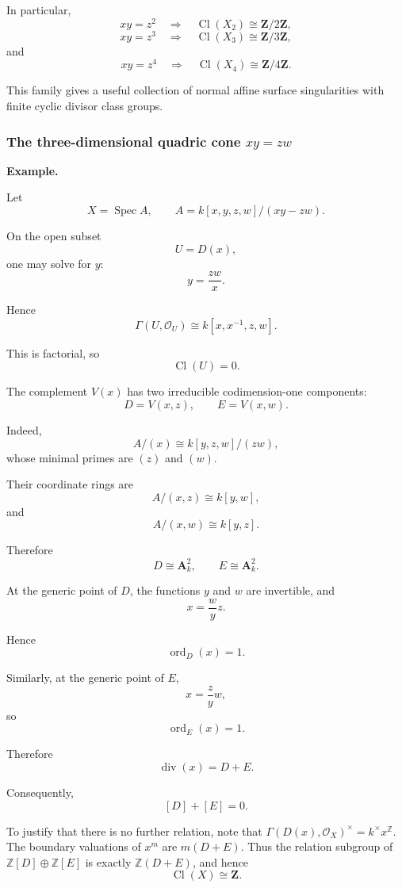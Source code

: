 In particular,
\[
xy=z^2
\quad\Longrightarrow\quad
\operatorname{Cl}(X_2)\cong\mathbf Z/2\mathbf Z,
\]
\[
xy=z^3
\quad\Longrightarrow\quad
\operatorname{Cl}(X_3)\cong\mathbf Z/3\mathbf Z,
\]
and
\[
xy=z^4
\quad\Longrightarrow\quad
\operatorname{Cl}(X_4)\cong\mathbf Z/4\mathbf Z.
\]

This family gives a useful collection of normal affine surface singularities with finite cyclic divisor class groups.

\subsubsection{\texorpdfstring{The three-dimensional quadric cone \(xy=zw\)}{The quadric cone xy=zw}}

\textbf{Example.}

Let
\[
X=\operatorname{Spec}A,
\qquad
A=k[x,y,z,w]/(xy-zw).
\]

On the open subset
\[
U=D(x),
\]
one may solve for \(y\):
\[
y=\frac{zw}{x}.
\]

Hence
\[
\Gamma(U,\mathcal O_U)
\cong
k[x,x^{-1},z,w].
\]

This is factorial, so
\[
\operatorname{Cl}(U)=0.
\]

The complement \(V(x)\) has two irreducible codimension-one components:
\[
D=V(x,z),
\qquad
E=V(x,w).
\]

Indeed,
\[
A/(x)
\cong
k[y,z,w]/(zw),
\]
whose minimal primes are \((z)\) and \((w)\).

Their coordinate rings are
\[
A/(x,z)\cong k[y,w],
\]
and
\[
A/(x,w)\cong k[y,z].
\]

Therefore
\[
D\cong\mathbf A^2_k,
\qquad
E\cong\mathbf A^2_k.
\]

At the generic point of \(D\), the functions \(y\) and \(w\) are invertible, and
\[
x=\frac{w}{y}z.
\]

Hence
\[
\operatorname{ord}_D(x)=1.
\]

Similarly, at the generic point of \(E\),
\[
x=\frac{z}{y}w,
\]
so
\[
\operatorname{ord}_E(x)=1.
\]

Therefore
\[
\operatorname{div}(x)=D+E.
\]

Consequently,
\[
[D]+[E]=0.
\]

To justify that there is no further relation, note that
\(\Gamma(D(x),\mathcal O_X)^\times=k^\times x^{\mathbb Z}\).
The boundary valuations of \(x^m\) are \(m(D+E)\).
Thus the relation subgroup of \(\mathbb Z[D]\oplus\mathbb Z[E]\)
is exactly \(\mathbb Z(D+E)\), and hence
\[
\boxed{
	\operatorname{Cl}(X)\cong\mathbf Z.
}
\]

